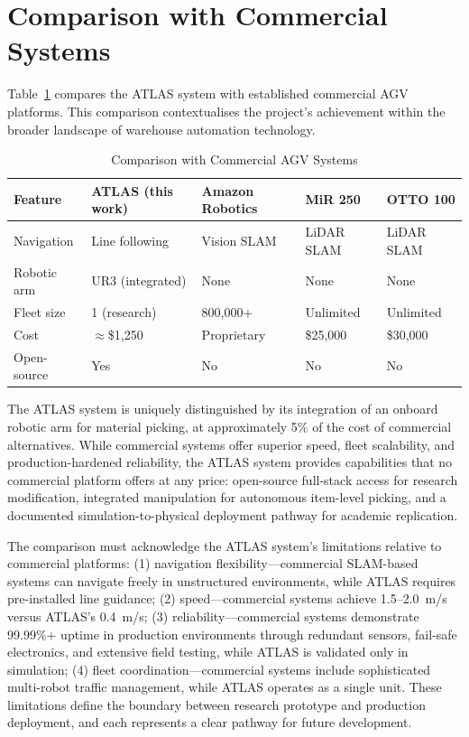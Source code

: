 \documentclass[12pt,a4paper,oneside]{report}
\begin{document}
\section{Comparison with Commercial Systems}

Table~\ref{tab:comparison} compares the ATLAS system with established commercial AGV platforms. This comparison contextualises the project's achievement within the broader landscape of warehouse automation technology.

\begin{table}[H]
\centering
\caption{Comparison with Commercial AGV Systems}
\label{tab:comparison}
\begin{tabular}{p{3cm} p{2.5cm} p{2.5cm} p{2.5cm} p{2.5cm}}
\toprule
\textbf{Feature} & \textbf{ATLAS (this work)} & \textbf{Amazon Robotics} & \textbf{MiR 250} & \textbf{OTTO 100} \\
\midrule
Navigation & Line following & Vision SLAM & LiDAR SLAM & LiDAR SLAM \\
Robotic arm & UR3 (integrated) & None & None & None \\
Fleet size & 1 (research) & 800,000+ & Unlimited & Unlimited \\
Cost & $\approx$\$1,250 & Proprietary & \$25,000 & \$30,000 \\
Open-source & Yes & No & No & No \\
\bottomrule
\end{tabular}
\end{table}

The ATLAS system is uniquely distinguished by its integration of an onboard robotic arm for material picking, at approximately 5\% of the cost of commercial alternatives. While commercial systems offer superior speed, fleet scalability, and production-hardened reliability, the ATLAS system provides capabilities that no commercial platform offers at any price: open-source full-stack access for research modification, integrated manipulation for autonomous item-level picking, and a documented simulation-to-physical deployment pathway for academic replication.

The comparison must acknowledge the ATLAS system's limitations relative to commercial platforms: (1) navigation flexibility---commercial SLAM-based systems can navigate freely in unstructured environments, while ATLAS requires pre-installed line guidance; (2) speed---commercial systems achieve 1.5--2.0~m/s versus ATLAS's 0.4~m/s; (3) reliability---commercial systems demonstrate 99.99\%+ uptime in production environments through redundant sensors, fail-safe electronics, and extensive field testing, while ATLAS is validated only in simulation; (4) fleet coordination---commercial systems include sophisticated multi-robot traffic management, while ATLAS operates as a single unit. These limitations define the boundary between research prototype and production deployment, and each represents a clear pathway for future development.
\end{document}

